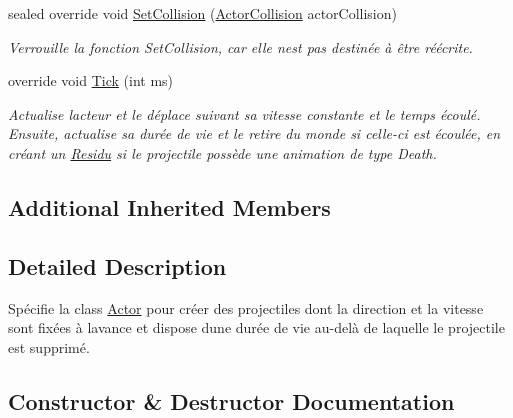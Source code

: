\begin{DoxyCompactItemize}
sealed override void \hyperlink{class_tentacle_slicers_1_1actors_1_1_missile_a978a6d6f78b7059b86747b9fbaf7f9fc}{Set\+Collision} (\hyperlink{class_tentacle_slicers_1_1collisions_1_1_actor_collision}{Actor\+Collision} actor\+Collision)
\begin{DoxyCompactList}\small\item\em Verrouille la fonction Set\+Collision, car elle n\textquotesingle{}est pas destinée à être réécrite. \end{DoxyCompactList}\item 
override void \hyperlink{class_tentacle_slicers_1_1actors_1_1_missile_ad07d0a9fe7aa8abce9aa5df78ebbb8be}{Tick} (int ms)
\begin{DoxyCompactList}\small\item\em Actualise l\textquotesingle{}acteur et le déplace suivant sa vitesse constante et le temps écoulé. Ensuite, actualise sa durée de vie et le retire du monde si celle-\/ci est écoulée, en créant un \hyperlink{class_tentacle_slicers_1_1actors_1_1_residu}{Residu} si le projectile possède une animation de type Death. \end{DoxyCompactList}\end{DoxyCompactItemize}
\subsection*{Additional Inherited Members}


\subsection{Detailed Description}
Spécifie la class \hyperlink{class_tentacle_slicers_1_1actors_1_1_actor}{Actor} pour créer des projectiles dont la direction et la vitesse sont fixées à l\textquotesingle{}avance et dispose d\textquotesingle{}une durée de vie au-\/delà de laquelle le projectile est supprimé. 



\subsection{Constructor \& Destructor Documentation}
\mbox{\label{class_tentacle_slicers_1_1actors_1_1_missile_a4fa7de73c4d8aa4b6b51598ea60a4431}} 
